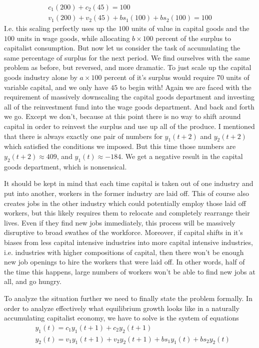 \documentclass{article}
\theoremstyle{theorem}
\begin{document}
\begin{align}
	c_1(200) + c_2(45) = 100 \\
	v_1(200)+v_2(45)+bs_1(100)+bs_2(100) = 100
\end{align} 
I.e. this scaling perfectly uses up the $100$ units of value in capital goods and the $100$ units in wage goods, while allocating $b\times 100$ percent of the surplus to capitalist consumption. But now let us consider the task of accumulating the same percentage of surplus for the next period. We find ourselves with the same problem as before, but reversed, and more dramatic. To just scale up the capital goods industry alone by $a \times 100$ percent of it's surplus would require $70$ units of variable capital, and we only have $45$ to begin with! Again we are faced with the requirement of massively downscaling the capital goods department and investing all of the reinvestment fund into the wage goods department. And back and forth we go. Except we don't, because at this point there is no way to shift around capital in order to reinvest the surplus and use up all of the produce. I mentioned that there is always exactly one pair of numbers for $y_1(t+2)$ and $y_2(t+2)$ which satisfied the conditions we imposed. But this time those numbers are $y_2(t+2) \approx 409$, and $y_1(t) \approx -184$. We get a negative result in the capital goods department, which is nonsensical. \par
It should be kept in mind that each time capital is taken out of one industry and put into another, workers in the former industry are laid off. This of course also creates jobs in the other industry which could potentially employ those laid off workers, but this likely requires them to relocate and completely rearrange their lives. Even if they find new jobs immediately, this process will be massively disruptive to broad swathes of the workforce. Moreover, if capital shifts in it's biases from less capital intensive industries into more capital intensive industries, i.e. industries with higher compositions of capital, then there won't be enough new job openings to hire the workers that were laid off. In other words, half of the time this happens, large numbers of workers won't be able to find new jobs at all, and go hungry. \par 
To analyze the situation further we need to finally state the problem formally. In order to analyze effectively what equilibrium growth looks like in a naturally accumulating capitalist economy, we have to solve is the system of equations
\begin{align}
	& y_1(t) = c_1y_1(t+1) + c_2y_2(t+1) \label{sys1} \\
	& y_2(t) = v_1y_1(t+1) + v_2y_2(t+1) + bs_1y_1(t) + bs_2y_2(t) \label{sys2}
\end{align}
\end{document}
